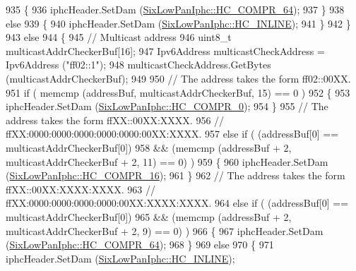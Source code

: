 \begin{DoxyCode}
935             \{
936               iphcHeader.SetDam (\hyperlink{classns3_1_1SixLowPanIphc_a384e6b68c86e9d9a07c923dbc21a6843a79b29ccd0370a00b3e182abee52ea59a}{SixLowPanIphc::HC\_COMPR\_64});
937             \}
938           \textcolor{keywordflow}{else}
939             \{
940               iphcHeader.SetDam (\hyperlink{classns3_1_1SixLowPanIphc_a384e6b68c86e9d9a07c923dbc21a6843a67481ea7303a3a3bcdd03f14630a1e42}{SixLowPanIphc::HC\_INLINE});
941             \}
942         \}
943       \textcolor{keywordflow}{else}
944         \{
945           \textcolor{comment}{// Multicast address}
946           uint8\_t multicastAddrCheckerBuf[16];
947           Ipv6Address multicastCheckAddress = Ipv6Address (\textcolor{stringliteral}{"ff02::1"});
948           multicastCheckAddress.GetBytes (multicastAddrCheckerBuf);
949 
950           \textcolor{comment}{// The address takes the form ff02::00XX.}
951           \textcolor{keywordflow}{if} ( memcmp (addressBuf, multicastAddrCheckerBuf, 15) == 0 )
952             \{
953               iphcHeader.SetDam (\hyperlink{classns3_1_1SixLowPanIphc_a384e6b68c86e9d9a07c923dbc21a6843a20c6daaf8cc1cfec17270484cec677c0}{SixLowPanIphc::HC\_COMPR\_0});
954             \}
955           \textcolor{comment}{// The address takes the form ffXX::00XX:XXXX.}
956           \textcolor{comment}{//                            ffXX:0000:0000:0000:0000:0000:00XX:XXXX.}
957           \textcolor{keywordflow}{else} \textcolor{keywordflow}{if} ( (addressBuf[0] == multicastAddrCheckerBuf[0])
958                     && (memcmp (addressBuf + 2, multicastAddrCheckerBuf + 2, 11) == 0) )
959             \{
960               iphcHeader.SetDam (\hyperlink{classns3_1_1SixLowPanIphc_a384e6b68c86e9d9a07c923dbc21a6843a492caa9d3c810686e9e3f1c35ef39fd9}{SixLowPanIphc::HC\_COMPR\_16});
961             \}
962           \textcolor{comment}{// The address takes the form ffXX::00XX:XXXX:XXXX.}
963           \textcolor{comment}{//                            ffXX:0000:0000:0000:0000:00XX:XXXX:XXXX.}
964           \textcolor{keywordflow}{else} \textcolor{keywordflow}{if} ( (addressBuf[0] == multicastAddrCheckerBuf[0])
965                     && (memcmp (addressBuf + 2, multicastAddrCheckerBuf + 2, 9) == 0) )
966             \{
967               iphcHeader.SetDam (\hyperlink{classns3_1_1SixLowPanIphc_a384e6b68c86e9d9a07c923dbc21a6843a79b29ccd0370a00b3e182abee52ea59a}{SixLowPanIphc::HC\_COMPR\_64});
968             \}
969           \textcolor{keywordflow}{else}
970             \{
971               iphcHeader.SetDam (\hyperlink{classns3_1_1SixLowPanIphc_a384e6b68c86e9d9a07c923dbc21a6843a67481ea7303a3a3bcdd03f14630a1e42}{SixLowPanIphc::HC\_INLINE});

\end{DoxyCode}
